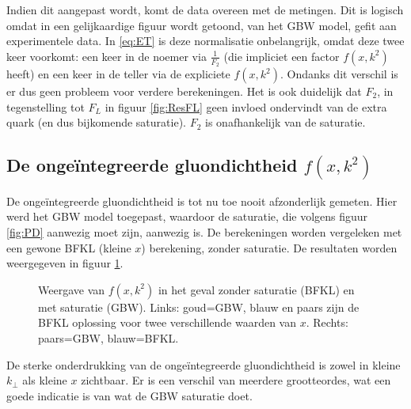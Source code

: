 \documentclass[a4paper,11pt]{article}
\numberwithin{equation}{section} %
\begin{document}
Indien dit aangepast wordt, komt de data overeen met de metingen.
Dit is logisch omdat in \cite[p. 55]{GB} een gelijkaardige figuur wordt getoond, van het GBW model, gefit aan experimentele data.
In \eqref{eq:ET} is deze normalisatie onbelangrijk, omdat deze twee keer voorkomt: een keer in de noemer via $\frac{1}{F_2}$ (die impliciet een factor $f(x,k^2)$ heeft) en een keer in de teller via de expliciete $f(x,k^2)$.
Ondanks dit verschil is er dus geen probleem voor verdere berekeningen.
Het is ook duidelijk dat $F_2$, in tegenstelling tot $F_L$ in figuur \ref{fig:ResFL} geen invloed ondervindt van de extra quark (en dus bijkomende saturatie).
$F_2$ is onafhankelijk van de saturatie.

  \subsection{De ongeïntegreerde gluondichtheid $f(x,k^2)$} \label{sec:ResUGD}
De ongeïntegreerde gluondichtheid is tot nu toe nooit afzonderlijk gemeten.
Hier werd het GBW model toegepast, waardoor de saturatie, die volgens figuur \ref{fig:PD} aanwezig moet zijn, aanwezig is.
De berekeningen worden vergeleken met een gewone BFKL (kleine $x$) berekening, zonder saturatie.
De resultaten worden weergegeven in figuur \ref{fig:ResUGD}.
\begin{figure} [H]
\centering
{}
\caption{Weergave van $f(x,k^2)$ in het geval zonder saturatie (BFKL) en met saturatie (GBW). Links: goud=GBW, blauw en paars zijn de BFKL oplossing voor twee verschillende waarden van $x$. Rechts: paars=GBW, blauw=BFKL.}
\label{fig:ResUGD}
\end{figure}
De sterke onderdrukking van de ongeïntegreerde gluondichtheid is zowel in kleine $k_\perp$ als kleine $x$ zichtbaar.
Er is een verschil van meerdere grootteordes, wat een goede indicatie is van wat de GBW saturatie doet.
\end{document}
